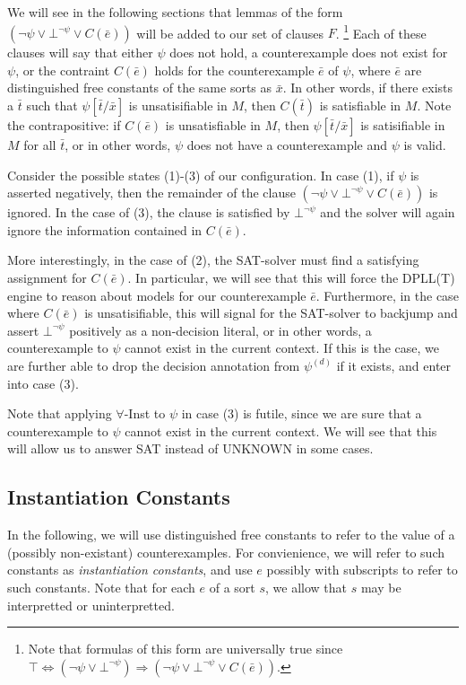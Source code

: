 \documentclass{llncs}
\begin{document}
We will see in the following sections that lemmas of the form $( \neg \psi \vee \bot^{\neg \psi} \vee C(\bar{e}))$ will be added to our set of clauses $F$.
\footnote{ Note that formulas of this form are universally true since $\top \Leftrightarrow ( \neg \psi \vee \bot^{\neg \psi}) \Rightarrow ( \neg \psi \vee \bot^{\neg \psi} \vee C(\bar{e}))$. }
Each of these clauses will say that either $\psi$ does not hold, a counterexample does not exist for $\psi$, or the contraint $C(\bar{e})$ holds for the counterexample $\bar{e}$ of $\psi$,  where $\bar{e}$ are distinguished free constants of the same sorts as $\bar{x}$.
In other words, if there exists a $\bar{t}$ such that $\psi[\bar{t}/\bar{x}]$ is unsatisifiable in $M$, then $C( \bar{t})$ is satisfiable in $M$.
Note the contrapositive: if $C( \bar{e} )$ is unsatisfiable in $M$, then $\psi[\bar{t}/\bar{x}]$ is satisifiable in $M$ for all $\bar{t}$, or in other words, $\psi$ does not have a counterexample and $\psi$ is valid.

Consider the possible states (1)-(3) of our configuration.
In case (1), if $\psi$ is asserted negatively, then the remainder of the clause $( \neg \psi \vee \bot^{\neg \psi} \vee C(\bar{e}))$ is ignored.
In the case of (3), the clause is satisfied by $\bot^{\neg \psi}$ and the solver will again ignore the information contained in $C(\bar{e})$.

More interestingly, in the case of (2), the SAT-solver must find a satisfying assignment for $C(\bar{e})$.
In particular, we will see that this will force the DPLL(T) engine to reason about models for our counterexample $\bar{e}$.
Furthermore, in the case where $C(\bar{e})$ is unsatisifiable, this will signal for the SAT-solver to backjump and assert $\bot^{\neg \psi}$ positively as a non-decision literal, or in other words, a counterexample to $\psi$ cannot exist in the current context.
If this is the case, we are further able to drop the decision annotation from $\psi^{(d)}$ if it exists, and enter into case (3).

Note that applying $\forall$-Inst to $\psi$ in case (3) is futile, since we are sure that a counterexample to $\psi$ cannot exist in the current context.
We will see that this will allow us to answer SAT instead of UNKNOWN in some cases.

\subsection{Instantiation Constants}

In the following, we will use distinguished free constants to refer to the value of a (possibly non-existant) counterexamples.
For convienience, we will refer to such constants as \emph{instantiation constants}, and use $e$ possibly with subscripts to refer to such constants.
Note that for each $e$ of a sort $s$, we allow that $s$ may be interpretted or uninterpretted.
\end{document}
